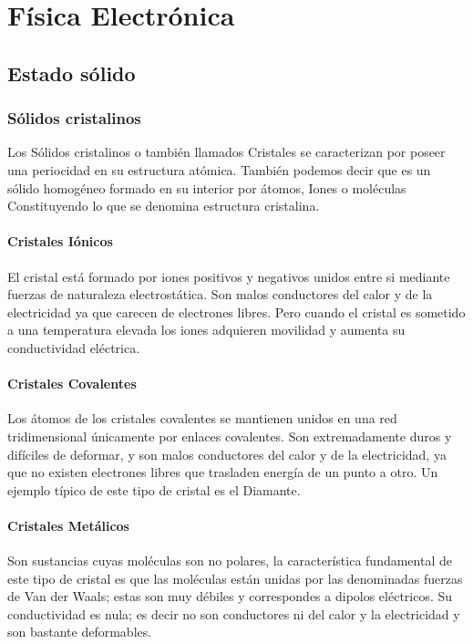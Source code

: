\documentclass[oneside]{book}
\numberwithin{equation}{section}
\numberwithin{figure}{section}
\numberwithin{table}{section}
\begin{document}
\part{Física Electrónica}

	\chapter{Estado sólido}
		\section{Sólidos cristalinos}	
			
				Los Sólidos cristalinos o también llamados Cristales se caracterizan por poseer una periocidad en su estructura atómica. También podemos decir que es un sólido homogéneo formado en su interior por átomos, Iones o moléculas Constituyendo lo que se denomina estructura cristalina.\\
				
			\subsection{Cristales Iónicos}
			
				El cristal está formado por iones positivos y negativos unidos entre si mediante fuerzas de naturaleza electrostática. Son malos conductores del calor y de la electricidad ya que carecen de electrones libres. Pero cuando el cristal es sometido a una temperatura elevada los iones adquieren movilidad y aumenta su conductividad eléctrica.
			
			\subsection{Cristales Covalentes}
			
				Los átomos de los cristales covalentes se mantienen unidos en una red tridimensional únicamente por enlaces covalentes. Son extremadamente duros y difíciles de deformar, y son malos conductores del calor y de la electricidad, ya que no existen electrones libres que trasladen energía de un punto a otro. Un ejemplo típico de este tipo de cristal es el Diamante. 			
			
			\subsection{Cristales Metálicos}
			
				Son sustancias cuyas moléculas son no polares, la característica fundamental de este tipo de cristal es que las moléculas están unidas por las denominadas fuerzas de Van der Waals; estas son muy débiles y correspondes a dipolos eléctricos. Su conductividad es nula; es decir no son conductores ni del calor y la electricidad y son bastante deformables.	
			
\end{document}
